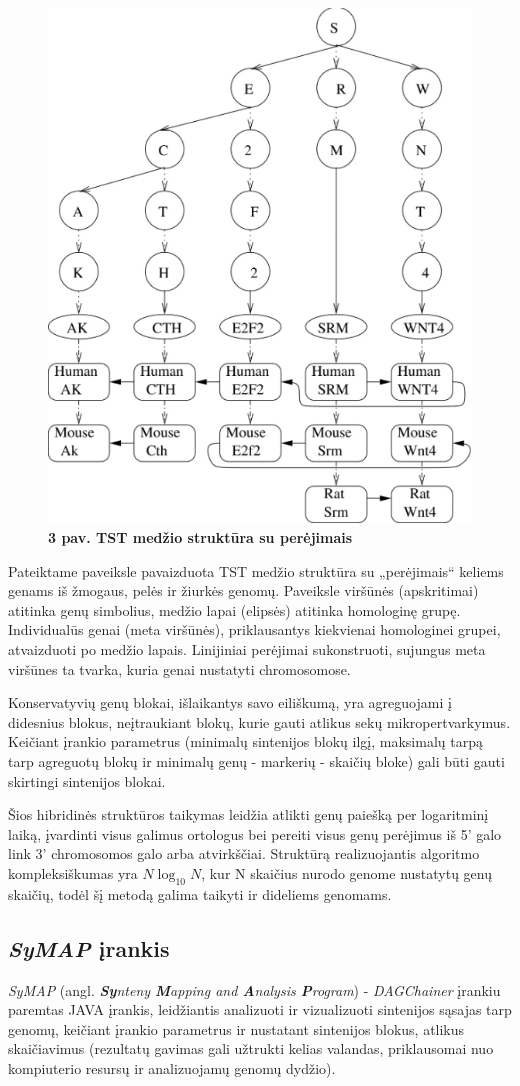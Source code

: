 \documentclass[12pt]{article}
\begin{document}
\begin{figure}[htb]
    \begin{center}
        \includegraphics[width=0.4\linewidth]{../Figures/TTS_data_structure.png}
        \vspace{-0.5\baselineskip}
        \caption*{\small\textbf{3 pav. TST medžio struktūra su perėjimais}}
        \label{fig:3}
    \end{center}
\end{figure}

Pateiktame paveiksle pavaizduota TST medžio struktūra su „perėjimais“ keliems
genams iš žmogaus, pelės ir žiurkės genomų. Paveiksle viršūnės (apskritimai)
atitinka genų simbolius, medžio lapai (elipsės) atitinka homologinę grupę.
Individualūs genai (meta viršūnės), priklausantys kiekvienai homologinei grupei,
atvaizduoti po medžio lapais. Linijiniai perėjimai sukonstruoti, sujungus meta
viršūnes ta tvarka, kuria genai nustatyti chromosomose.

Konservatyvių genų blokai, išlaikantys savo eiliškumą, yra agreguojami į
didesnius blokus, neįtraukiant blokų, kurie gauti atlikus sekų
mikropertvarkymus. Keičiant įrankio parametrus (minimalų sintenijos blokų
ilgį, maksimalų tarpą tarp agreguotų blokų ir minimalų genų - markerių - skaičių
bloke) gali būti gauti skirtingi sintenijos blokai.

Šios hibridinės struktūros taikymas leidžia atlikti genų paiešką per logaritminį
laiką, įvardinti visus galimus ortologus bei pereiti visus genų perėjimus iš 5'
galo link 3' chromosomos galo arba atvirkščiai. Struktūrą realizuojantis
algoritmo kompleksiškumas yra $ N\log_{10}N $, kur N skaičius nurodo genome
nustatytų genų skaičių, todėl šį metodą galima taikyti ir dideliems genomams.

\subsection{\emph{SyMAP} įrankis}
\emph{SyMAP}\cite{SYMAP} (angl. \emph{\textbf{Sy}nteny \textbf{M}apping and
\textbf{A}nalysis \textbf{P}rogram}) - \emph{DAGChainer}\cite{DAGCHAINER}
įrankiu paremtas JAVA įrankis, leidžiantis analizuoti ir vizualizuoti sintenijos
sąsajas tarp genomų, keičiant įrankio parametrus ir nustatant sintenijos blokus,
atlikus skaičiavimus (rezultatų gavimas gali užtrukti kelias valandas,
priklausomai nuo kompiuterio resursų ir analizuojamų genomų dydžio).
\end{document}
